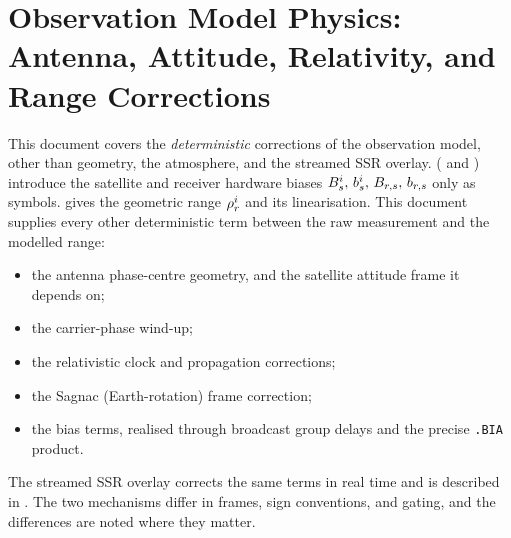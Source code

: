 \documentclass[main.tex]{subfiles}
\begin{document}
\section{Observation Model Physics: Antenna, Attitude, Relativity, and Range Corrections}\label{sec:obsphys}

\newcommand{\bframe}{\bm{F}}                       %
\newcommand{\isun}{\hat{\bm{x}}_\sat}              %
\newcommand{\jcross}{\hat{\bm{y}}_\sat}            %
\newcommand{\knad}{\hat{\bm{k}}_\sat}              %
\newcommand{\esun}{\hat{\bm{e}}_\odot}            %
\newcommand{\pco}{\bm{p}}                          %
\newcommand{\dipS}{\bm{D}_\sat}                    %
\newcommand{\dipR}{\bm{D}_\rx}                     %
\newcommand{\winddphi}{\Delta\varphi}             %

This document covers the \emph{deterministic} corrections of the
observation model, other than geometry, the atmosphere, and the streamed
SSR overlay.  
( and
) introduce the
satellite and receiver hardware biases $B^i_s,\,b^i_s,
\,B_{r,s},\,b_{r,s}$ only as symbols.
 gives the
geometric range $\rho^i_r$ and its linearisation.  This
document supplies every other deterministic term between the raw
measurement and the modelled range:
\begin{itemize}
\item the antenna phase-centre geometry, and the satellite attitude
      frame it depends on;
\item the carrier-phase wind-up;
\item the relativistic clock and propagation corrections;
\item the Sagnac (Earth-rotation) frame correction;
\item the bias terms, realised through broadcast group delays and the
      precise \texttt{.BIA} product.
\end{itemize}
The streamed SSR overlay corrects the same terms in real time and is
described in .  The two
mechanisms differ in frames, sign conventions, and gating, and the
differences are noted where they matter.
\end{document}
